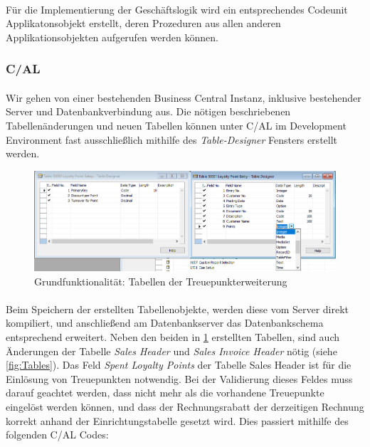 \paragraph{}
Für die Implementierung der Geschäftslogik wird ein entsprechendes Codeunit Applikatonsobjekt erstellt, deren Prozeduren aus allen anderen Applikationsobjekten aufgerufen werden können.

\subsubsection{C/AL}
\paragraph{}
Wir gehen von einer bestehenden Business Central Instanz, inklusive bestehender Server und Datenbankverbindung aus. Die nötigen beschriebenen Tabellenänderungen und neuen Tabellen können unter C/AL im Development Environment fast ausschließlich mithilfe des \textit{Table-Designer} Fensters erstellt werden.
\begin{figure}[h]
	\centering
	\includegraphics[width=130mm]{images/CALTableDesigner}
	\caption{Grundfunktionalität: Tabellen der Treuepunkterweiterung}
	\label{fig:Table Designer}
\end{figure}

\paragraph{}
Beim Speichern der erstellten Tabellenobjekte, werden diese vom Server direkt kompiliert, und anschließend am Datenbankserver das Datenbankschema entsprechend erweitert. Neben den beiden in \ref{fig:Table Designer} erstellten Tabellen, sind auch Änderungen der Tabelle \textit{Sales Header} und \textit{Sales Invoice Header} nötig (siehe \ref{fig:Tables}). Das Feld \textit{Spent Loyalty Points} der Tabelle {Sales Header} ist für die Einlösung von Treuepunkten notwendig. Bei der Validierung dieses Feldes muss darauf geachtet werden, dass nicht mehr als die vorhandene Treuepunkte eingelöst werden können, und dass der Rechnungsrabatt der derzeitigen Rechnung korrekt anhand der Einrichtungstabelle gesetzt wird. Dies passiert mithilfe des folgenden C/AL Codes:

